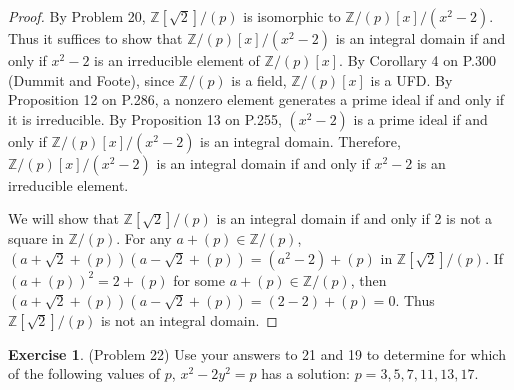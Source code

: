 \documentclass[12pt, psamsfonts]{amsart}
\theoremstyle{definition}
\newtheorem*{exer}{Exercise}
\theoremstyle{remark}
\numberwithin{equation}{section}
\begin{document}
\begin{proof}
  By Problem 20, $\mathbb{Z}[\sqrt{2}]/(p)$ is isomorphic to $\mathbb{Z}/(p)[x]/(x^2 - 2)$.
  Thus it suffices to show that $\mathbb{Z}/(p)[x]/(x^2 - 2)$ is an integral domain if and only if $x^2 - 2$ is an irreducible element of $\mathbb{Z}/(p)[x]$.
  By Corollary 4 on P.300 (Dummit and Foote), since $\mathbb{Z}/(p)$ is a field, $\mathbb{Z}/(p)[x]$ is a UFD.
  By Proposition 12 on P.286, a nonzero element generates a prime ideal if and only if it is irreducible.
  By Proposition 13 on P.255, $(x^2 - 2)$ is a prime ideal if and only if $\mathbb{Z}/(p)[x]/(x^2 - 2)$ is an integral domain.
  Therefore, $\mathbb{Z}/(p)[x]/(x^2 - 2)$ is an integral domain if and only if $x^2 - 2$ is an irreducible element.


  We will show that $\mathbb{Z}[\sqrt{2}]/(p)$ is an integral domain if and only if 2 is not a square in $\mathbb{Z}/(p)$.
  For any $a + (p) \in \mathbb{Z}/(p)$, $(a + \sqrt{2} + (p))(a - \sqrt{2} + (p)) = (a^2 - 2) + (p)$ in $\mathbb{Z}[\sqrt{2}]/(p)$.
  If $(a + (p))^2 = 2 + (p)$ for some $a + (p) \in \mathbb{Z}/(p)$, then $(a + \sqrt{2} + (p))(a - \sqrt{2} + (p)) = (2 - 2) + (p) = 0$.
  Thus $\mathbb{Z}[\sqrt{2}]/(p)$ is not an integral domain.

\end{proof}

\begin{exer}{(Problem 22)}
  Use your answers to 21 and 19 to determine for which of the following values of $p$, $x^2 - 2y^2 = p$ has a solution: $p = 3, 5, 7, 11, 13, 17$.
\end{exer}
\end{document}

